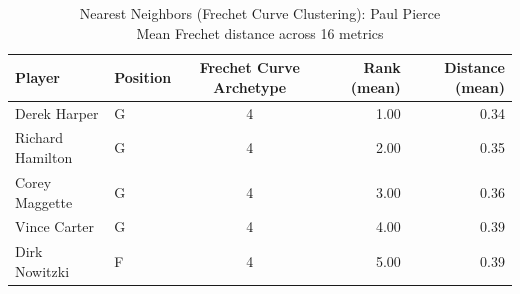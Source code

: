 \begin{table}[t]
\caption*{
{\fontsize{20}{25} Nearest Neighbors (Frechet Curve Clustering): Paul Pierce\fontsize{12}{15}\selectfont } \\ 
{\fontsize{14}{17}\selectfont  Mean Frechet distance across 16 metrics\fontsize{12}{15}\selectfont }
} 
\fontsize{12.0pt}{14.0pt}\selectfont
\begin{tabular*}{\linewidth}{@{\extracolsep{\fill}}llcrr}
\toprule
Player & Position & Frechet Curve Archetype & Rank (mean) & Distance (mean) \\ 
\midrule\addlinespace[2.5pt]
Derek Harper & G & 4 & 1.00 & 0.34 \\ 
Richard Hamilton & G & 4 & 2.00 & 0.35 \\ 
Corey Maggette & G & 4 & 3.00 & 0.36 \\ 
Vince Carter & G & 4 & 4.00 & 0.39 \\ 
Dirk Nowitzki & F & 4 & 5.00 & 0.39 \\ 
\bottomrule
\end{tabular*}
\end{table}

